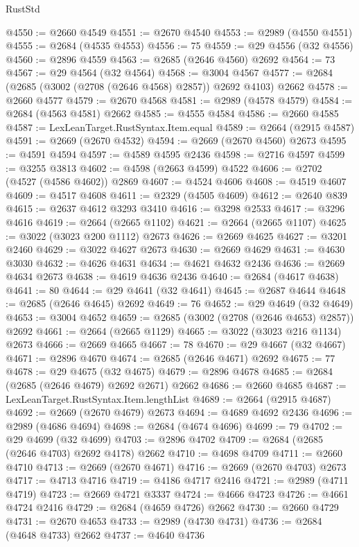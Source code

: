 \begin{lexlean}{RustStd}
\begin{coremodule}
@4550 := @2660 @4549
@4551 := @2670 @4540
@4553 := @2989 (@4550 @4551)
@4555 := @2684 (@4535 @4553)
@4556 := 75
@4559 := @29 @4556 (@32 @4556)
@4560 := @2896 @4559
@4563 := @2685 (@2646 @4560) @2692
@4564 := 73
@4567 := @29 @4564 (@32 @4564)
@4568 := @3004 @4567
@4577 := @2684 (@2685 (@3002 (@2708 (@2646 @4568) @2857)) @2692 @4103) @2662
@4578 := @2660 @4577
@4579 := @2670 @4568
@4581 := @2989 (@4578 @4579)
@4584 := @2684 (@4563 @4581) @2662
@4585 := @4555 @4584
@4586 := @2660 @4585
@4587 := LexLeanTarget.RustSyntax.Item.equal
@4589 := @2664 (@2915 @4587)
@4591 := @2669 (@2670 @4532)
@4594 := @2669 (@2670 @4560) @2673
@4595 := @4591 @4594
@4597 := @4589 @4595 @2436
@4598 := @2716 @4597
@4599 := @3255 @3813
@4602 := @4598 (@2663 @4599) @4522
@4606 := @2702 (@4527 (@4586 @4602)) @2869
@4607 := @4524 @4606
@4608 := @4519 @4607
@4609 := @4517 @4608
@4611 := @2329 (@4505 @4609)
@4612 := @2640 @839
@4615 := @2637 @4612 @3293 @3410
@4616 := @3298 @2533
@4617 := @3296 @4616
@4619 := @2664 (@2665 @1102)
@4621 := @2664 (@2665 @1107)
@4625 := @3022 (@3023 @200 @1112) @2673
@4626 := @2669 @4625
@4627 := @3201 @2460
@4629 := @3022 @4627 @2673
@4630 := @2669 @4629
@4631 := @4630 @3030
@4632 := @4626 @4631
@4634 := @4621 @4632 @2436
@4636 := @2669 @4634 @2673
@4638 := @4619 @4636 @2436
@4640 := @2684 (@4617 @4638)
@4641 := 80
@4644 := @29 @4641 (@32 @4641)
@4645 := @2687 @4644
@4648 := @2685 (@2646 @4645) @2692
@4649 := 76
@4652 := @29 @4649 (@32 @4649)
@4653 := @3004 @4652
@4659 := @2685 (@3002 (@2708 (@2646 @4653) @2857)) @2692
@4661 := @2664 (@2665 @1129)
@4665 := @3022 (@3023 @216 @1134) @2673
@4666 := @2669 @4665
@4667 := 78
@4670 := @29 @4667 (@32 @4667)
@4671 := @2896 @4670
@4674 := @2685 (@2646 @4671) @2692
@4675 := 77
@4678 := @29 @4675 (@32 @4675)
@4679 := @2896 @4678
@4685 := @2684 (@2685 (@2646 @4679) @2692 @2671) @2662
@4686 := @2660 @4685
@4687 := LexLeanTarget.RustSyntax.Item.lengthList
@4689 := @2664 (@2915 @4687)
@4692 := @2669 (@2670 @4679) @2673
@4694 := @4689 @4692 @2436
@4696 := @2989 (@4686 @4694)
@4698 := @2684 (@4674 @4696)
@4699 := 79
@4702 := @29 @4699 (@32 @4699)
@4703 := @2896 @4702
@4709 := @2684 (@2685 (@2646 @4703) @2692 @4178) @2662
@4710 := @4698 @4709
@4711 := @2660 @4710
@4713 := @2669 (@2670 @4671)
@4716 := @2669 (@2670 @4703) @2673
@4717 := @4713 @4716
@4719 := @4186 @4717 @2416
@4721 := @2989 (@4711 @4719)
@4723 := @2669 @4721 @3337
@4724 := @4666 @4723
@4726 := @4661 @4724 @2416
@4729 := @2684 (@4659 @4726) @2662
@4730 := @2660 @4729
@4731 := @2670 @4653
@4733 := @2989 (@4730 @4731)
@4736 := @2684 (@4648 @4733) @2662
@4737 := @4640 @4736

\end{coremodule}
\end{lexlean}
